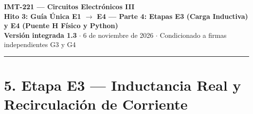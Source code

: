 \documentclass[10pt, a4paper, landscape]{article}
\begin{document}
\noindent
{\LARGE \textbf{\textcolor{ucbblue}{IMT-221 — Circuitos Electrónicos III}}}\\[0.12cm]
{\Large \textbf{Hito 3: Guía Única E1 $\rightarrow$ E4 — Parte 4: Etapas E3 (Carga Inductiva) y E4 (Puente H Físico y Python)}}\\[0.08cm]
{\small \textbf{Versión integrada 1.3} $\cdot$ 6 de noviembre de 2026 $\cdot$ Condicionado a firmas independientes G3 y G4}
\par\vspace{0.15cm}\noindent\rule{\linewidth}{0.4pt}\vspace{0.2cm}

\section*{5. Etapa E3 — Inductancia Real y Recirculación de Corriente}
\end{document}
